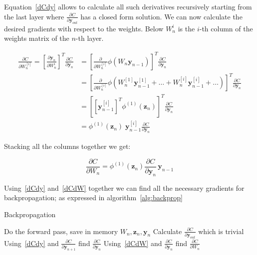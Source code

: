\documentclass{article}
\begin{document}
    Equation~\eqref{dCdy} allows to calculate all such derivatives recursively starting from the last layer where $\frac{\partial C}{\partial \textbf{y}_{out}}$ has a closed form solution.
    We can now calculate the desired gradients with respect to the weights.
    Below $W_n^i$ is the $i$-th column of the weights matrix of the $n$-th layer.

    \begin{align*}
        \frac{ \partial C}{\partial W_n^{[i]} }
        =
        \left[ \frac{ \partial \pmb{y}_{n}}{\partial W_n^i } \right]^T
        \frac{ \partial C}{\partial \pmb{y}_{n} }
        &=
        \left[ \frac{ \partial }{\partial W_n^{[i]} }  \phi( W_{n} \bm{y}_{n-1} )  \right]^T
        \frac{ \partial C}{\partial \pmb{y}_{n} }
        \\
        &=
        \left[ \frac{ \partial }{\partial W_n^{[i]} }  \phi(  W_{n}^{[1]} \bm{y}_{n-1}^{[1]} + \dots +W_{n}^{[i]} \bm{y}_{n-1}^{[i]} + \dots )  \right]^T
        \frac{ \partial C}{\partial \pmb{y}_{n} }
        \\
        &=
        \left[ \left[ \pmb{y}_{n-1}^{[i]} \right]^T \phi^{(1)}(\pmb{z}_n )  \right]^T
        \frac{ \partial C}{\partial \pmb{y}_{n} }
        \\
        &=
        \phi^{(1)}(\pmb{z}_n ) \; \pmb{y}_{n-1}^{[i]}
        \frac{ \partial C}{\partial \pmb{y}_{n} }
    \end{align*}

    Stacking all the columns together we get:

    \begin{equation}
        \label{dCdW}
        \frac{ \partial C}{\partial W_n}
        =
        \phi^{(1)}(\pmb{z}_n )
        \frac{ \partial C}{\partial \pmb{y}_{n} }  \,
        \pmb{y}_{n-1}
    \end{equation}

    Using~\eqref{dCdy} and~\eqref{dCdW} together we can find all the necessary gradients for backpropagation; as expressed in algorithm~\ref{alg:backprop}

    \begin{algorithm}
        \caption{Backpropagation}
        \label{alg:backprop}
        \begin{algorithmic}
            \State Do the forward pass, save in memory $W_n, \textbf{z}_n, \textbf{y}_n$
            \State Calculate $\frac{\partial C}{\partial \textbf{y}_{out}}$ which is trivial
                \State Using~\eqref{dCdy} and  $\frac{\partial C}{\partial \textbf{y}_{n+1}} $ find $\frac{\partial C}{\partial \textbf{y}_n}$
                \State  Using~\eqref{dCdW} and $\frac{\partial C}{\partial \textbf{y}_n}$ find $\frac{\partial C}{\partial W_n}$
            \EndFor
        \end{algorithmic}
    \end{algorithm}
\end{document}
